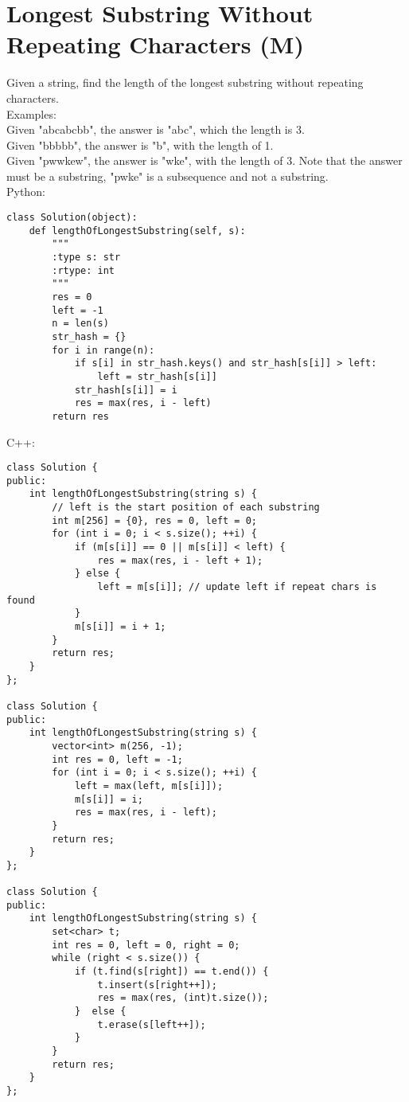 \section{Longest Substring Without Repeating Characters (M)}
Given a string, find the length of the longest substring without repeating characters.\\

Examples:\\
Given "abcabcbb", the answer is "abc", which the length is 3.\\
Given "bbbbb", the answer is "b", with the length of 1.\\
Given "pwwkew", the answer is "wke", with the length of 3. Note that the answer must be a substring, "pwke" is a subsequence and not a substring.\\

Python:
\lstset{language=python}
\begin{lstlisting}
class Solution(object):
    def lengthOfLongestSubstring(self, s):
        """
        :type s: str
        :rtype: int
        """
        res = 0
        left = -1
        n = len(s)
        str_hash = {}
        for i in range(n):
            if s[i] in str_hash.keys() and str_hash[s[i]] > left:
                left = str_hash[s[i]]
            str_hash[s[i]] = i
            res = max(res, i - left)
        return res
\end{lstlisting}

C++:
\lstset{language=C++}
\begin{lstlisting}
class Solution {
public:
    int lengthOfLongestSubstring(string s) {
        // left is the start position of each substring
        int m[256] = {0}, res = 0, left = 0;
        for (int i = 0; i < s.size(); ++i) {
            if (m[s[i]] == 0 || m[s[i]] < left) {
                res = max(res, i - left + 1);
            } else {
                left = m[s[i]]; // update left if repeat chars is found
            }
            m[s[i]] = i + 1;
        }
        return res;
    }
};

class Solution {
public:
    int lengthOfLongestSubstring(string s) {
        vector<int> m(256, -1);
        int res = 0, left = -1;
        for (int i = 0; i < s.size(); ++i) {
            left = max(left, m[s[i]]);
            m[s[i]] = i;
            res = max(res, i - left);
        }
        return res;
    }
};

class Solution {
public:
    int lengthOfLongestSubstring(string s) {
        set<char> t;
        int res = 0, left = 0, right = 0;
        while (right < s.size()) {
            if (t.find(s[right]) == t.end()) {
                t.insert(s[right++]);
                res = max(res, (int)t.size());
            }  else {
                t.erase(s[left++]);
            }
        }
        return res;
    }
};
\end{lstlisting}


